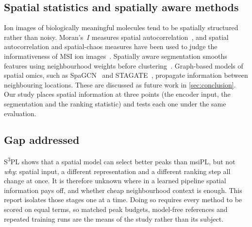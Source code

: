 \subsection{Spatial statistics and spatially aware methods}
Ion images of biologically meaningful molecules tend to be spatially
structured rather than noisy. Moran's~$I$ measures spatial
autocorrelation~\citep{moran1950notes}, and spatial autocorrelation and
spatial-chaos measures have been used to judge the informativeness of MSI ion
images~\citep{alexandrov2013testing,cassese2016spatial}. Spatially aware
segmentation smooths features using neighbourhood weights before
clustering~\citep{alexandrov2011efficient}. Graph-based models of spatial
omics, such as SpaGCN~\citep{hu2021spagcn} and STAGATE~\citep{dong2022stagate},
propagate information between neighbouring locations. These are
discussed as future work in \cref{sec:conclusion}. Our study places spatial
information at three points (the encoder input, the segmentation and the
ranking statistic) and tests each one under the same evaluation.

\subsection{Gap addressed}
S\textsuperscript{3}PL shows that a spatial model can select better peaks than
msiPL, but not \emph{why}: spatial input, a different representation and a
different ranking step all change at once. It is therefore unknown where in a
learned pipeline spatial information pays off, and whether cheap neighbourhood
context is enough. This report isolates those stages one at a time. Doing so
requires every method to be scored on equal terms, so matched peak budgets,
model-free references and repeated training runs are the means of the study
rather than its subject.
